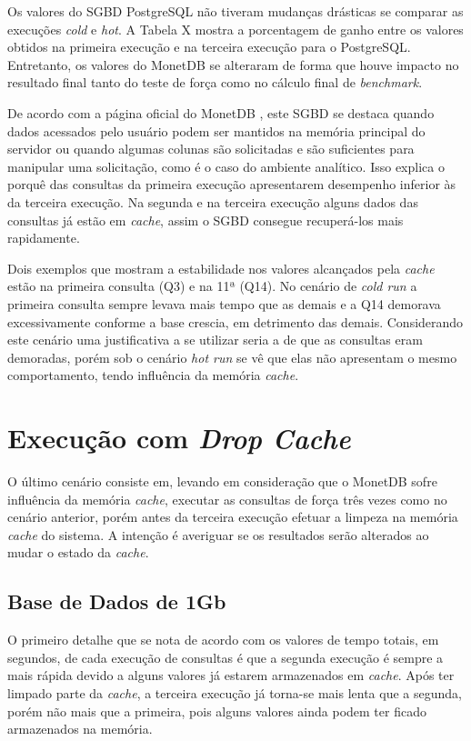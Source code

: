 Os valores do SGBD PostgreSQL não tiveram mudanças drásticas se comparar as execuções \textit{cold} e \textit{hot}. A Tabela X mostra a porcentagem de ganho entre os valores obtidos na primeira execução e na terceira execução para o PostgreSQL. Entretanto, os valores do MonetDB se alteraram de forma que houve impacto no resultado final tanto do teste de força como no cálculo final de \textit{benchmark}.

De acordo com a página oficial do MonetDB \cite{monetdb2017c}, este SGBD se destaca quando dados acessados pelo usuário podem ser mantidos na memória principal do servidor ou quando algumas colunas são solicitadas e são suficientes para manipular uma solicitação, como é o caso do ambiente analítico. Isso explica o porquê das consultas da primeira execução apresentarem desempenho inferior às da terceira execução. Na segunda e na terceira execução alguns dados das consultas já estão em \textit{cache}, assim o SGBD consegue recuperá-los mais rapidamente.

Dois exemplos que mostram a estabilidade nos valores alcançados pela \textit{cache} estão na primeira consulta (Q3) e na 11ª (Q14). No cenário de \textit{cold run} a primeira consulta sempre levava mais tempo que as demais e a Q14 demorava excessivamente conforme a base crescia, em detrimento das demais. Considerando este cenário uma justificativa a se utilizar seria a de que as consultas eram demoradas, porém sob o cenário \textit{hot run} se vê que elas não apresentam o mesmo comportamento, tendo influência da memória \textit{cache}.

\section{Execução com \textit{Drop Cache}}

O último cenário consiste em, levando em consideração que o MonetDB sofre influência da memória \textit{cache}, executar as consultas de força três vezes como no cenário anterior, porém antes da terceira execução efetuar a limpeza na memória \textit{cache} do sistema. A intenção é averiguar se os resultados serão alterados ao mudar o estado da \textit{cache}.

\subsection{Base de Dados de 1Gb}

O primeiro detalhe que se nota de acordo com os valores de tempo totais, em segundos, de cada execução de consultas é que a segunda execução é sempre a mais rápida devido a alguns valores já estarem armazenados em \textit{cache}. Após ter limpado parte da \textit{cache}, a terceira execução já torna-se mais lenta que a segunda, porém não mais que a primeira, pois alguns valores ainda podem ter ficado armazenados na memória.

